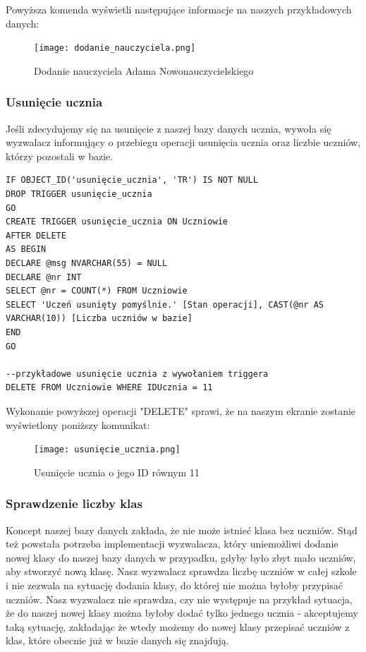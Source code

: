 \documentclass[60pt]{article}
\begin{document}
Powyższa komenda wyświetli następujące informacje na naszych przykładowych danych:

\begin{figure}[h]
  \texttt{[image: dodanie\_nauczyciela.png]}
  \caption{Dodanie nauczyciela Adama Nowonauczycielskiego}
  \label{Dodanie nauczyciela Adama Nowonauczycielskiego}
\end{figure}

\subsubsection{Usunięcie ucznia}

Jeśli zdecydujemy się na usunięcie z naszej bazy danych ucznia, wywoła się wyzwalacz informujący o przebiegu operacji usunięcia ucznia oraz liczbie uczniów, którzy pozostali w bazie. 

\begin{verbatim}
IF OBJECT_ID('usunięcie_ucznia', 'TR') IS NOT NULL
DROP TRIGGER usunięcie_ucznia
GO
CREATE TRIGGER usunięcie_ucznia ON Uczniowie
AFTER DELETE
AS BEGIN
DECLARE @msg NVARCHAR(55) = NULL
DECLARE @nr INT
SELECT @nr = COUNT(*) FROM Uczniowie
SELECT 'Uczeń usunięty pomyślnie.' [Stan operacji], CAST(@nr AS VARCHAR(10)) [Liczba uczniów w bazie]
END
GO

--przykładowe usunięcie ucznia z wywołaniem triggera
DELETE FROM Uczniowie WHERE IDUcznia = 11
\end{verbatim}

Wykonanie powyższej operacji "DELETE" sprawi, że na naszym ekranie zostanie wyświetlony poniższy komunikat:

\begin{figure}[h]
  \texttt{[image: usunięcie\_ucznia.png]}
  \caption{Usunięcie ucznia o jego ID równym 11}
  \label{Usunięcie ucznia o jego ID równym 11}
\end{figure}

\subsubsection{Sprawdzenie liczby klas}

Koncept naszej bazy danych zakłada, że nie może istnieć klasa bez uczniów. Stąd też powstała potrzeba implementacji wyzwalacza, który uniemożliwi dodanie nowej klasy do naszej bazy danych w przypadku, gdyby było zbyt mało uczniów, aby stworzyć nową klasę. Nasz wyzwalacz sprawdza liczbę uczniów w całej szkole i nie zezwala na sytuację dodania klasy, do której nie można byłoby przypisać uczniów. Nasz wyzwalacz nie sprawdza, czy nie występuje na przykład sytuacja, że do naszej nowej klasy można byłoby dodać tylko jednego ucznia - akceptujemy taką sytuację, zakładając że wtedy możemy do nowej klasy przepisać uczniów z klas, które obecnie już w bazie danych się znajdują. 
\end{document}
